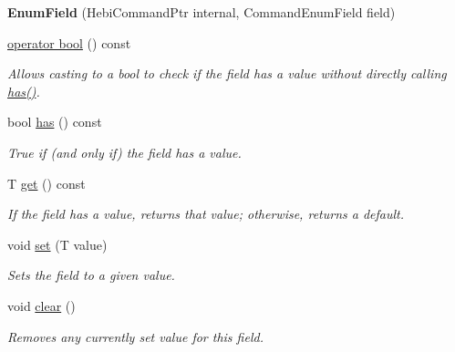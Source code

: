 \begin{DoxyCompactItemize}
\item 
\mbox{\label{classhebi_1_1Command_1_1EnumField_aa2a658eb3d71afcdeb2a47a65414bb89}} 
{\bfseries Enum\+Field} (Hebi\+Command\+Ptr internal, Command\+Enum\+Field field)
\item 
\hyperlink{classhebi_1_1Command_1_1EnumField_a31db0d8c93e30a521b636b8383c97314}{operator bool} () const
\begin{DoxyCompactList}\small\item\em Allows casting to a bool to check if the field has a value without directly calling {\ttfamily \hyperlink{classhebi_1_1Command_1_1EnumField_a4323594bf8b1c8c621a027d869ea7281}{has()}}. \end{DoxyCompactList}\item 
\mbox{\label{classhebi_1_1Command_1_1EnumField_a4323594bf8b1c8c621a027d869ea7281}} 
bool \hyperlink{classhebi_1_1Command_1_1EnumField_a4323594bf8b1c8c621a027d869ea7281}{has} () const
\begin{DoxyCompactList}\small\item\em True if (and only if) the field has a value. \end{DoxyCompactList}\item 
\mbox{\label{classhebi_1_1Command_1_1EnumField_a7bcd2cb52c7c395b976dc3b33c0a6c49}} 
T \hyperlink{classhebi_1_1Command_1_1EnumField_a7bcd2cb52c7c395b976dc3b33c0a6c49}{get} () const
\begin{DoxyCompactList}\small\item\em If the field has a value, returns that value; otherwise, returns a default. \end{DoxyCompactList}\item 
\mbox{\label{classhebi_1_1Command_1_1EnumField_abdd656f051b4fc58cfc206ceb07a5b17}} 
void \hyperlink{classhebi_1_1Command_1_1EnumField_abdd656f051b4fc58cfc206ceb07a5b17}{set} (T value)
\begin{DoxyCompactList}\small\item\em Sets the field to a given value. \end{DoxyCompactList}\item 
\mbox{\label{classhebi_1_1Command_1_1EnumField_aa05f2160dbc34d73877ee308f71130a1}} 
void \hyperlink{classhebi_1_1Command_1_1EnumField_aa05f2160dbc34d73877ee308f71130a1}{clear} ()
\begin{DoxyCompactList}\small\item\em Removes any currently set value for this field. \end{DoxyCompactList}\end{DoxyCompactItemize}



